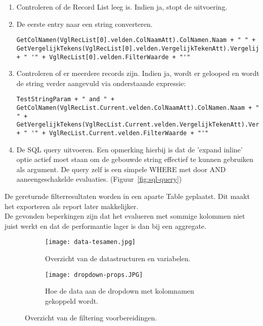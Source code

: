 \begin{itemize}
    \begin{enumerate}
        \item Controleren of de Record List leeg is. Indien ja, stopt de uitvoering.
        \item De eerste entry naar een string converteren. 
\begin{lstlisting}
GetColNamen(VglRecList[0].velden.ColNaamAtt).ColNamen.Naam + " " + GetVergelijkTekens(VglRecList[0].velden.VergelijkTekenAtt).VergelijkTekens.Teken + " '" + VglRecList[0].velden.FilterWaarde + "'"
\end{lstlisting}
        \item Controleren of er meerdere records zijn. Indien ja, wordt er gelooped en wordt de string verder aangevuld via onderstaande expressie:
\begin{lstlisting}
TestStringParam + " and " + GetColNamen(VglRecList.Current.velden.ColNaamAtt).ColNamen.Naam + " " + GetVergelijkTekens(VglRecList.Current.velden.VergelijkTekenAtt).VergelijkTekens.Teken + " '" + VglRecList.Current.velden.FilterWaarde + "'"
\end{lstlisting}
        \item De SQL query uitvoeren. Een opmerking hierbij is dat de 'expand inline' optie actief moet staan om de gebouwde string effectief te kunnen gebruiken als argument. De query zelf is een simpele WHERE met door AND aaneengeschakelde evaluaties. (Figuur~\ref{fig:sql-query})
    \end{enumerate}
    De gereturnde filterresultaten worden in een aparte Table geplaatst. Dit maakt het exporteren als report later makkelijker.\\
    De gevonden beperkingen zijn dat het evalueren met sommige kolommen niet juist werkt en dat de performantie lager is dan bij een aggregate.
\end{itemize}


\begin{figure}[h!]
    \centering
    \begin{subfigure}[b]{0.3\linewidth}
        \texttt{[image: data-tesamen.jpg]}
        \caption{Overzicht van de datastructuren en variabelen.}
    \end{subfigure}
    \begin{subfigure}[b]{0.5\linewidth}
        \texttt{[image: dropdown-props.JPG]}
        \caption{Hoe de data aan de dropdown met kolomnamen gekoppeld wordt.}
    \end{subfigure}
    \caption{Overzicht van de filtering voorbereidingen.}
    \label{fig:data-en-dropdown}
\end{figure}

